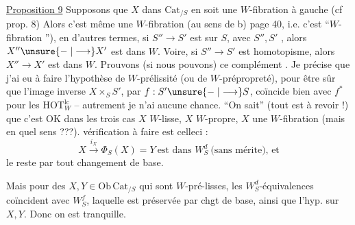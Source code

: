 \uline{Proposition 9}  Supposons que $X$ dans $\mathrm{Cat}_{/S}$    en soit une $W$-fibration à gauche (cf prop. 8) Alors c'est même une $W$-fibration (au sens de b) page 40,
i.e.  c'est  ``$W$-fibration ''), en d'autres termes, si $S''\longrightarrow S'$ est  sur $S$, avec $S'',S'$ , alors $X''\unsure{\relbar|\longrightarrow}X'$ est  dans $W$. Voire,  si $S''\longrightarrow S'$ est  homotopisme, alors $X''\longrightarrow X'$ est dans $W$.
Prouvons (si nous pouvons) ce complément . Je précise que j'ai eu à faire l'hypothèse de $W$-prélissité  (ou de $W$-prépropreté), pour être
sûr que l'image inverse $X\times_S S'$, par $f:S'\unsure{\relbar|\longrightarrow}S$, coïncide bien avec $f^*$ pour les $\mathrm{HOT}_W^{\mathrm{lc}}$ -- autrement je n'ai aucune chance. ``On sait'' (tout est à revoir !) que c'est OK
dans les trois cas $X$ $W$-lisse, $X$ $W$-propre, $X$ une $W$-fibration (mais en quel sens ???).  vérification à faire  est celle\unsure{-| }ci :
\[
X\overset{i_X}{\longrightarrow}\Phi_S(X)=Y\ \text{est dans }W_S^d\ \text{(sans mérite), et}\tag*{(*)}
\]
le reste par tout changement de base.

Mais pour des $X,Y\in\mathrm{Ob}\,\mathrm{Cat}_{/S}$ qui sont $W$-pré-lisses, les $W_S^d$-équivalences coïncident avec $W_S^f$, laquelle est préservée par chgt de base, ainsi que l'hyp. sur $X,Y$. Donc on est tranquille.

